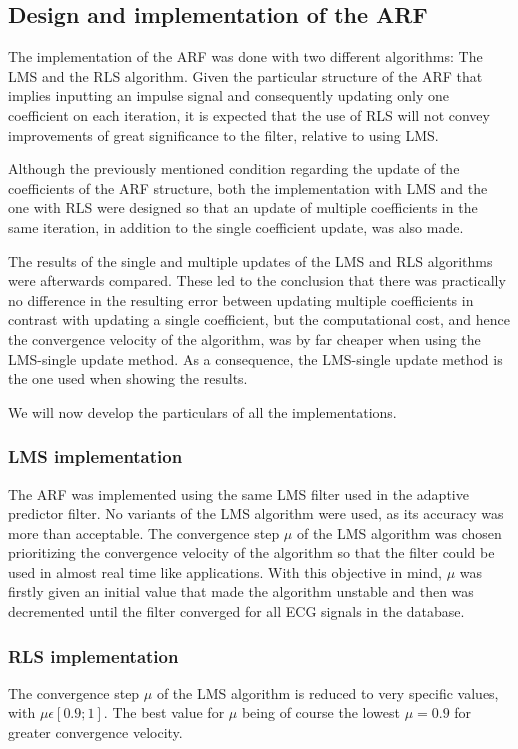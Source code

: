 \documentclass[conference]{IEEEtran}
\begin{document}
\subsection{Design and implementation of the ARF}

The implementation of the ARF was done with two different algorithms: The LMS and the RLS algorithm.
Given the particular structure of the ARF that implies inputting an impulse signal and consequently updating only one coefficient on each iteration, it is expected that the use of RLS will not convey improvements of great significance to the filter, relative to using LMS. \par 
Although the previously mentioned condition regarding the update of the coefficients of the ARF structure, both the implementation with LMS and the one with RLS were designed so that an update of multiple coefficients in the same iteration, in addition to the single coefficient update, was also made. \par
The results of the single and multiple updates of the LMS and RLS algorithms were afterwards compared. These led to the conclusion that there was practically no difference in the resulting error between updating multiple coefficients in contrast with updating a single coefficient, but the computational cost, and hence the convergence velocity of the algorithm, was by far cheaper when using the LMS-single update method. As a consequence, the LMS-single update method is the one used when showing the results.\par
We will now develop the particulars of all the implementations.

\subsubsection{LMS implementation} 
The ARF was implemented using the same LMS filter used in the adaptive predictor filter. No variants of the LMS algorithm were used, as its accuracy was more than acceptable. The convergence step $\mu$ of the LMS algorithm was chosen prioritizing the convergence velocity of the algorithm so that the filter could be used in almost real time like applications. With this objective in mind, $\mu$ was firstly given an initial value that made the algorithm unstable and then was decremented until the filter converged for all ECG signals in the database. \par
\subsubsection{RLS implementation}
The convergence step $\mu$ of the LMS algorithm is reduced to very specific values, with $\mu \epsilon [0.9; 1]$. The best value for $\mu$ being of course the lowest $\mu = 0.9$ for greater convergence velocity. 
\end{document}
